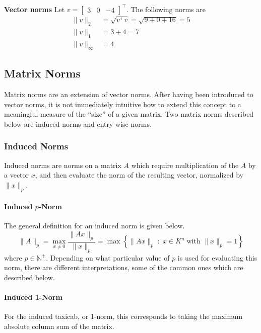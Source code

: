 \begin{example}
  \textbf{Vector norms}
  Let $v=\begin{bmatrix} 3 & 0 & -4 \end{bmatrix}^{\top}$.
  The following norms are
  \begin{equation*}
    \begin{split}
      \|v\|_{2}&=\sqrt{v^{\top}v}=\sqrt{9+0+16}=5 \\
      \|v\|_{1}&=3+4=7 \\
      \|v\|_{\infty}&=4
    \end{split}
  \end{equation*}
\end{example}

\subsection{Matrix Norms}
Matrix norms are an extension of vector norms.
After having been introduced to vector norms, it is not immediately intuitive how to extend this concept to a meaningful measure of the ``size'' of a given matrix.
Two matrix norms described below are induced norms and entry wise norms.

\subsubsection{Induced Norms}

Induced norms are norms on a matrix $A$ which require multiplication of the $A$ by a vector $x$, and then evaluate the norm of the resulting vector, normalized by $\|x\|_{p}$.

\paragraph{Induced $p$-Norm}
The general definition for an induced norm is given below.
\begin{equation*}
  \|A\|_{p}=\max_{x\neq0}\frac{\|Ax\|_{p}}{\|x\|_{p}}=\max\left\{\|Ax\|_{p}\;:\;x\in K^{n}\;\text{with }\|x\|_{p}=1\right\}
\end{equation*}
where $p\in\mathbb{N}^{+}$.
Depending on what particular value of $p$ is used for evaluating this norm, there are different interpretations, some of the common ones which are described below.

\paragraph{Induced 1-Norm}
For the induced taxicab, or 1-norm, this corresponds to taking the maximum absolute column sum of the matrix.


